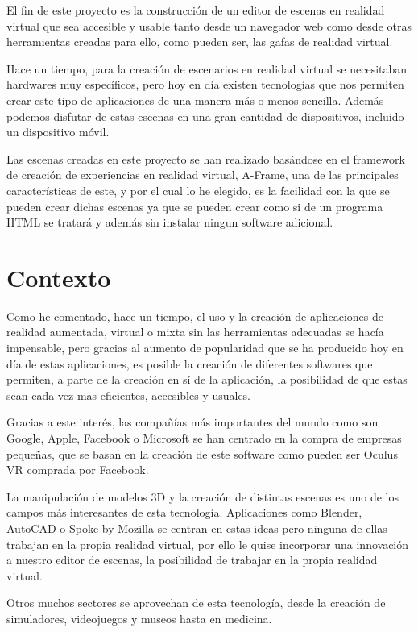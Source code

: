 \documentclass[a4paper, 12pt]{book}
\begin{document}
El fin de este proyecto es la construcción de un editor de escenas en realidad virtual que sea accesible y usable tanto desde un navegador web como desde otras herramientas creadas para ello, como pueden ser, las gafas de realidad virtual.

Hace un tiempo, para la creación de escenarios en realidad virtual se necesitaban hardwares muy específicos, pero hoy en día existen tecnologías que nos permiten crear este tipo de aplicaciones de una manera más o menos sencilla. Además podemos disfutar de estas escenas en una gran cantidad de dispositivos, incluido un dispositivo móvil.

Las escenas creadas en este proyecto se han realizado basándose en el framework de creación de experiencias en realidad virtual, A-Frame, una de las principales características de este, y por el cual lo he elegido, es la facilidad con la que se pueden crear dichas escenas ya que se pueden crear como si de un programa HTML se tratará y además sin instalar ningun software adicional.

\section{Contexto}
\label{sec:contexto}

Como he comentado, hace un tiempo, el uso y la creación de aplicaciones de realidad aumentada, virtual o mixta sin las herramientas adecuadas se hacía impensable, pero gracias al aumento de popularidad que se ha producido hoy en día de estas aplicaciones, es posible la creación de diferentes softwares que permiten, a parte de la creación en sí de la aplicación, la posibilidad de que estas sean cada vez mas eficientes, accesibles y usuales.

Gracias a este interés, las compañías más importantes del mundo como son Google, Apple, Facebook o Microsoft se han centrado en la compra de empresas pequeñas, que se basan en la creación de este software como pueden ser Oculus VR comprada por Facebook. 

La manipulación de modelos 3D y la creación de distintas escenas es uno de los campos más interesantes de esta tecnología. Aplicaciones como Blender, AutoCAD o Spoke by Mozilla se centran en estas ideas pero ninguna de ellas trabajan en la propia realidad virtual, por ello le quise incorporar una innovación a nuestro editor de escenas, la posibilidad de trabajar en la propia realidad virtual.

Otros muchos sectores se aprovechan de esta tecnología, desde la creación de  simuladores, videojuegos y museos hasta en medicina.
\end{document}
